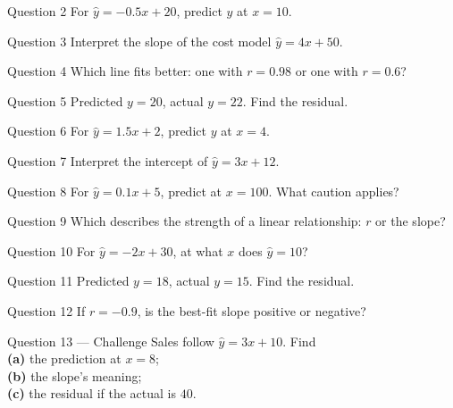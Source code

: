 \documentclass[11pt]{article}
\begin{document}
\begin{qbox}{Question 2}
For $\hat y=-0.5x+20$, predict $y$ at $x=10$.\workspace{2.4cm}
\end{qbox}

\begin{qbox}{Question 3}
Interpret the slope of the cost model $\hat y=4x+50$.\workspace{2.4cm}
\end{qbox}

\begin{qbox}{Question 4}
Which line fits better: one with $r=0.98$ or one with $r=0.6$?\workspace{2.4cm}
\end{qbox}

\begin{qbox}{Question 5}
Predicted $y=20$, actual $y=22$. Find the residual.\workspace{2.4cm}
\end{qbox}

\begin{qbox}{Question 6}
For $\hat y=1.5x+2$, predict $y$ at $x=4$.\workspace{2.4cm}
\end{qbox}

\begin{qbox}{Question 7}
Interpret the intercept of $\hat y=3x+12$.\workspace{2.4cm}
\end{qbox}

\begin{qbox}{Question 8}
For $\hat y=0.1x+5$, predict at $x=100$. What caution applies?\workspace{2.4cm}
\end{qbox}

\begin{qbox}{Question 9}
Which describes the strength of a linear relationship: $r$ or the slope?\workspace{2.4cm}
\end{qbox}

\begin{qbox}{Question 10}
For $\hat y=-2x+30$, at what $x$ does $\hat y=10$?\workspace{2.4cm}
\end{qbox}

\begin{qbox}{Question 11}
Predicted $y=18$, actual $y=15$. Find the residual.\workspace{2.4cm}
\end{qbox}

\begin{qbox}{Question 12}
If $r=-0.9$, is the best-fit slope positive or negative?\workspace{2.4cm}
\end{qbox}

\begin{qbox}{Question 13 --- Challenge}
Sales follow $\hat y=3x+10$. Find \\ \textbf{(a)} the prediction at $x=8$; \\ \textbf{(b)} the slope's meaning; \\ \textbf{(c)} the residual if the actual is $40$.\workspace{3cm}
\end{qbox}
\end{document}
